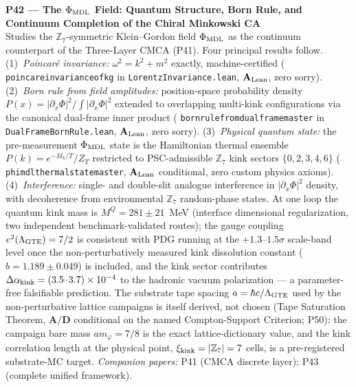 \documentclass[11pt]{article}
\newcommand{\lean}[1]{%
  \penalty-100
  \begingroup\def\_{{\textunderscore\allowbreak}}\texttt{#1}\endgroup}
\newcommand{\CatAL}{\ensuremath{\textbf{A}_{\rm Lean}}}
\newcommand{\CatAD}{\textbf{A/D}}
\begin{document}
\medskip
\noindent\textbf{P42 — The $\Phi_{\rm MDL}$ Field: Quantum Structure, Born Rule,
and Continuum Completion of the Chiral Minkowski CA}~\cite{SpivackPhiMDLField}\\
Studies the $\mathbb{Z}_7$-symmetric Klein--Gordon field $\Phi_{\rm MDL}$ as the
continuum counterpart of the Three-Layer CMCA (P41).  Four principal results follow.
(1)~\textit{Poincaré invariance:} $\omega^2 = k^2 + m^2$ exactly, machine-certified
(\lean{poincare\_invariance\_of\_kg} in \lean{LorentzInvariance.lean}, $\CatAL$, zero sorry).
(2)~\textit{Born rule from field amplitudes:} position-space probability density
$P(x) = |\partial_x\Phi|^2/\int|\partial_x\Phi|^2$ extended to overlapping multi-kink
configurations via the canonical dual-frame inner product
(\lean{born\_rule\_from\_dual\_frame\_master} in \lean{DualFrameBornRule.lean},
$\CatAL$, zero sorry).
(3)~\textit{Physical quantum state:} the pre-measurement $\Phi_{\rm MDL}$ state
is the Hamiltonian thermal ensemble $P(k) = e^{-M_k/T}/Z_T$ restricted to
PSC-admissible $\mathbb{Z}_7$ kink sectors $\{0,2,3,4,6\}$
(\lean{phimdl\_thermal\_state\_master}, $\CatAL$ conditional, zero custom physics axioms).
(4)~\textit{Interference:} single- and double-slit analogue interference in
$|\partial_x\Phi|^2$ density, with decoherence from environmental $\mathbb{Z}_7$
random-phase states.
At one loop the quantum kink mass is $M^Q = 281 \pm 21$~MeV (interface dimensional
regularization, two independent benchmark-validated routes); the gauge coupling
$e^2(\Lambda_{\rm GTE}) = 7/2$ is consistent with PDG running at the
$+1.3$--$1.5\sigma$ scale-band level once the non-perturbatively measured kink
dissolution constant ($b = 1.189 \pm 0.049$) is included, and the kink sector
contributes $\Delta\alpha_{\rm kink} = (3.5\text{--}3.7)\times10^{-4}$ to the
hadronic vacuum polarization --- a parameter-free falsifiable prediction.
The substrate tape spacing $a = \hbar c/\Lambda_{\rm GTE}$ used by the
non-perturbative lattice campaigns is itself derived, not chosen (Tape
Saturation Theorem, $\CatAD$ conditional on the named Compton-Support
Criterion; P50): the campaign bare mass $am_\varphi = 7/8$ is the exact
lattice-dictionary value, and the kink correlation length at the physical
point, $\xi_{\rm kink} = |\mathbb{Z}_7| = 7$ cells, is a pre-registered
substrate-MC target.
\emph{Companion papers:} P41 (CMCA discrete layer); P43 (complete unified framework).
\end{document}
